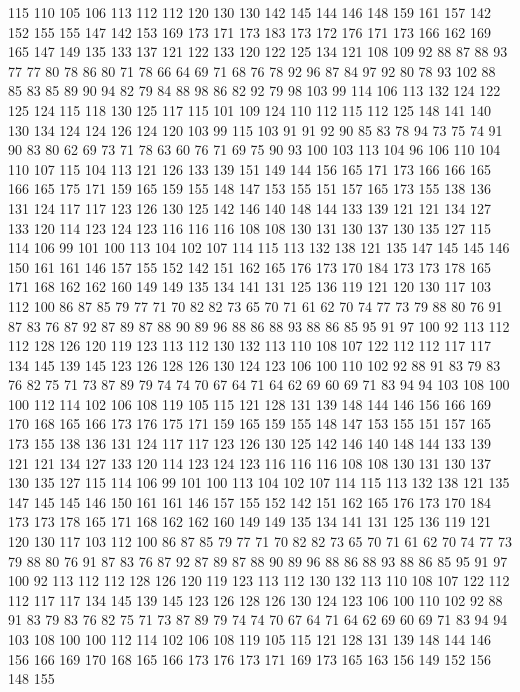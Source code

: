 115 110 105 106 113 112 112 120 130 130 142 145 144 146 148 159 161 157 142 152
155 155 147 142 153 169 173 171 173 183 173 172 176 171 173 166 162 169 165 147
149 135 133 137 121 122 133 120 122 125 134 121 108 109 92 88 87 88 93 77
77 80 78 86 80 71 78 66 64 69 71 68 76 78 92 96 87 84 97 92
80 78 93 102 88 85 83 85 89 90 94 82 79 84 88 98 86 82 92 79
98 103 99 114 106 113 132 124 122 125 124 115 118 130 125 117 115 101 109 124
110 112 115 112 125 148 141 140 130 134 124 124 126 124 120 103 99 115 103 91
91 92 90 85 83 78 94 73 75 74 91 90 83 80 62 69 73 71 78 63
60 76 71 69 75 90 93 100 103 113 104 96 106 110 104 110 107 115 104 113
121 126 133 139 151 149 144 156 165 171 173 166 166 165 166 165 175 171 159 165
159 155 148 147 153 155 151 157 165 173 155 138 136 131 124 117 117 123 126 130
125 142 146 140 148 144 133 139 121 121 134 127 133 120 114 123 124 123 116 116
116 108 108 130 131 130 137 130 135 127 115 114 106 99 101 100 113 104 102 107
114 115 113 132 138 121 135 147 145 145 146 150 161 161 146 157 155 152 142 151
162 165 176 173 170 184 173 173 178 165 171 168 162 162 160 149 149 135 134 141
131 125 136 119 121 120 130 117 103 112 100 86 87 85 79 77 71 70 82 82
73 65 70 71 61 62 70 74 77 73 79 88 80 76 91 87 83 76 87 92
87 89 87 88 90 89 96 88 86 88 93 88 86 85 95 91 97 100 92 113
112 112 128 126 120 119 123 113 112 130 132 113 110 108 107 122 112 112 117 117
134 145 139 145 123 126 128 126 130 124 123 106 100 110 102 92 88 91 83 79
83 76 82 75 71 73 87 89 79 74 74 70 67 64 71 64 62 69 60 69
71 83 94 94 103 108 100 100 112 114 102 106 108 119 105 115 121 128 131 139
148 144 146 156 166 169 170 168 165 166 173 176 175 171 159 165 159 155 148 147
153 155 151 157 165 173 155 138 136 131 124 117 117 123 126 130 125 142 146 140
148 144 133 139 121 121 134 127 133 120 114 123 124 123 116 116 116 108 108 130
131 130 137 130 135 127 115 114 106 99 101 100 113 104 102 107 114 115 113 132
138 121 135 147 145 145 146 150 161 161 146 157 155 152 142 151 162 165 176 173
170 184 173 173 178 165 171 168 162 162 160 149 149 135 134 141 131 125 136 119
121 120 130 117 103 112 100 86 87 85 79 77 71 70 82 82 73 65 70 71
61 62 70 74 77 73 79 88 80 76 91 87 83 76 87 92 87 89 87 88
90 89 96 88 86 88 93 88 86 85 95 91 97 100 92 113 112 112 128 126
120 119 123 113 112 130 132 113 110 108 107 122 112 112 117 117 134 145 139 145
123 126 128 126 130 124 123 106 100 110 102 92 88 91 83 79 83 76 82 75
71 73 87 89 79 74 74 70 67 64 71 64 62 69 60 69 71 83 94 94
103 108 100 100 112 114 102 106 108 119 105 115 121 128 131 139 148 144 146 156
166 169 170 168 165 166 173 176 173 171 169 173 165 163 156 149 152 156 148 155
